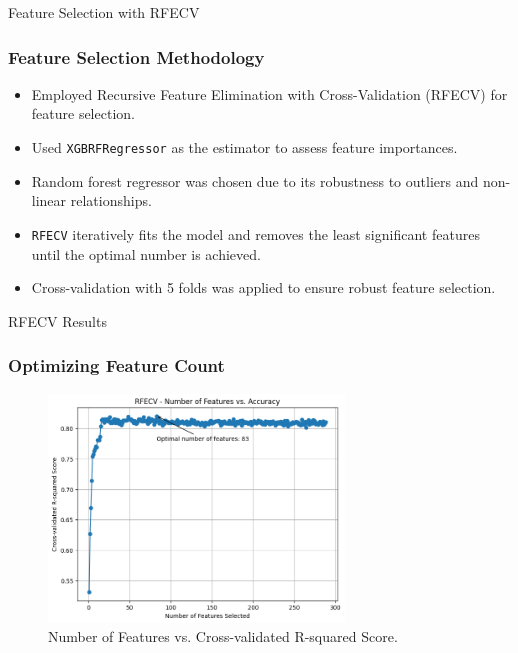 \begin{frame}{Feature Selection with RFECV}
    \frametitle{Feature Selection Methodology}
    \begin{itemize}
        \item Employed Recursive Feature Elimination with Cross-Validation (RFECV) for feature selection.
        \item Used \texttt{XGBRFRegressor} as the estimator to assess feature importances.
        \item Random forest regressor was chosen due to its robustness to outliers and non-linear relationships.
        \item \texttt{RFECV} iteratively fits the model and removes the least significant features until the optimal number is achieved.
        \item Cross-validation with 5 folds was applied to ensure robust feature selection.
    \end{itemize}
\end{frame}

\begin{frame}{RFECV Results}
    \frametitle{Optimizing Feature Count}
    \begin{figure}
        \includegraphics[width=0.7\textwidth]{figures/n_features_vs_score.png} 
        \caption{Number of Features vs. Cross-validated R-squared Score.}
        \label{fig:rfecv_plot}
    \end{figure}
\end{frame}

